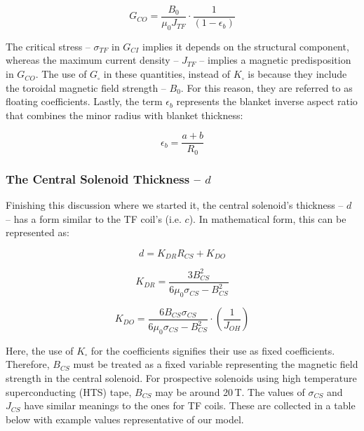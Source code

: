 \begin{equation}
	G_{CO} = \frac{B_{0}}{ \mu_0 J_{TF} } \cdot \frac{1}{ ( 1 - \epsilon_b )}
\end{equation}

The critical stress -- $\sigma_{TF}$ in $G_{CI}$ implies it depends on the structural component, whereas the maximum current density -- $J_{TF}$ -- implies a magnetic predisposition in $G_{CO}$. The use of $G_\square$ in these quantities, instead of $K_\square$ is because they include the toroidal magnetic field strength -- $B_0$. For this reason, they are referred to as floating coefficients. Lastly, the term $\epsilon_b$ represents the blanket inverse aspect ratio that combines the minor radius with blanket thickness:

\begin{equation}
	\epsilon_b = \frac{ a + b }{R_0}
\end{equation}

\subsubsection{The Central Solenoid Thickness -- $d$}

Finishing this discussion where we started it, the central solenoid's thickness -- $d$ -- has a form similar to the TF coil's (i.e. $c$). In mathematical form, this can be represented as:

 \begin{equation}
 	\label{eq:dd}
	d = K_{DR} R_{CS} + K_{DO}
\end{equation}

\begin{equation}
	K_{DR} = \frac{3 B_{CS}^2}{ 6 \mu_0 \sigma_{CS}  - B_{CS}^2 }
\end{equation}

\begin{equation}
	K_{DO} = \frac{6 B_{CS} \sigma_{CS}}{ 6 \mu_0 \sigma_{CS}  - B_{CS}^2 } \cdot \left( \frac{1}{J_{OH}} \right)
\end{equation}

Here, the use of $K_\square$ for the coefficients signifies their use as fixed coefficients. Therefore, $B_{CS}$ must be treated as a fixed variable representing the magnetic field strength in the central solenoid. For prospective solenoids using high temperature superconducting (HTS) tape, $B_{CS}$ may be around 20\,T. The values of $\sigma_{CS}$ and $J_{CS}$ have similar meanings to the ones for TF coils. These are collected in a table below with example values representative of our model.

